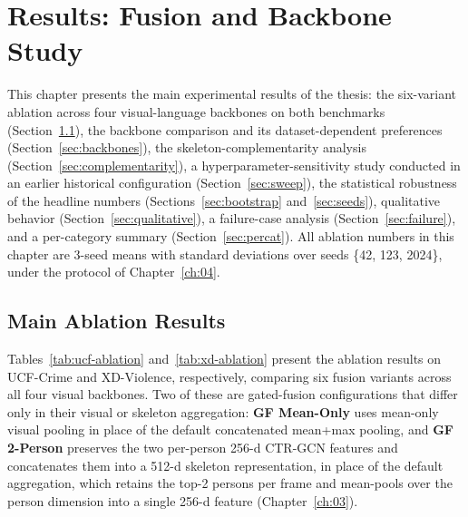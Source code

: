 \chapter{Results: Fusion and Backbone Study}
\label{ch:05}

This chapter presents the main experimental results of the thesis: the
six-variant ablation across four visual-language backbones on both benchmarks
(Section~\ref{sec:ablation}), the backbone comparison and its
dataset-dependent preferences (Section~\ref{sec:backbones}), the
skeleton-complementarity analysis (Section~\ref{sec:complementarity}), a
hyperparameter-sensitivity study conducted in an earlier historical
configuration (Section~\ref{sec:sweep}), the statistical robustness of the
headline numbers (Sections~\ref{sec:bootstrap} and~\ref{sec:seeds}),
qualitative behavior (Section~\ref{sec:qualitative}), a failure-case analysis
(Section~\ref{sec:failure}), and a per-category summary
(Section~\ref{sec:percat}). All ablation numbers in this chapter are 3-seed
means with standard deviations over seeds \{42, 123, 2024\}, under the
protocol of Chapter~\ref{ch:04}.

\section{Main Ablation Results}
\label{sec:ablation}

Tables~\ref{tab:ucf-ablation} and~\ref{tab:xd-ablation} present the ablation
results on UCF-Crime and XD-Violence, respectively, comparing six fusion
variants across all four visual backbones. Two of these are gated-fusion
configurations that differ only in their visual or skeleton aggregation:
\textbf{GF Mean-Only} uses mean-only visual pooling in place of the default
concatenated mean+max pooling, and \textbf{GF 2-Person} preserves the two
per-person 256-d CTR-GCN features and concatenates them into a 512-d skeleton
representation, in place of the default aggregation, which retains the top-2
persons per frame and mean-pools over the person dimension into a single
256-d feature (Chapter~\ref{ch:03}).

